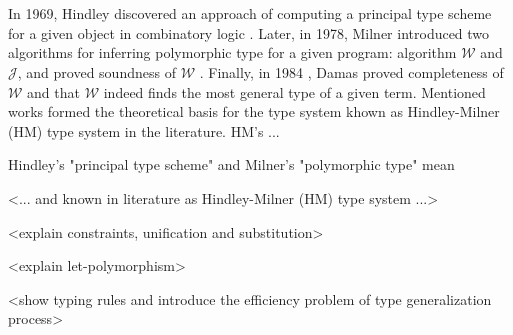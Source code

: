 \chapter{}
\label{chap:lr}



\section{}

In 1969, Hindley discovered an approach of computing a principal type scheme for a given object in combinatory logic \cite{Hindley1969_PrincipalTypeScheme}. Later, in 1978, Milner introduced two algorithms for inferring polymorphic type for a given program: algorithm $\mathcal{W}$ and $\mathcal{J}$, and proved soundness of $\mathcal{W}$ \cite{Milner1978_TypePolymorphism}. Finally, in 1984 \cite{Damas1984_TypeAssignment}, Damas proved completeness of $\mathcal{W}$ and that $\mathcal{W}$ indeed finds the most general type of a given term. Mentioned works formed the theoretical basis for the type system khown as Hindley-Milner (HM) type system in the literature. HM's ...


Hindley's "principal type scheme" and Milner's "polymorphic type" mean 

<... and known in literature as Hindley-Milner (HM) type system ...>

<explain constraints, unification and substitution>

<explain let-polymorphism>

<show typing rules and introduce the efficiency problem of type generalization process>

